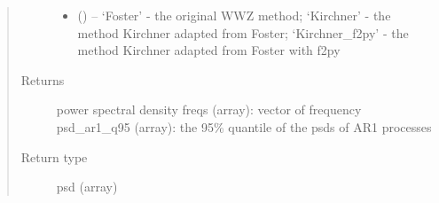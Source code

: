 \documentclass[letterpaper,10pt,english]{sphinxmanual}
\begin{document}
\begin{fulllineitems}
\begin{quote}
\begin{description}
\begin{itemize}
\item {} 
 () -- `Foster' - the original WWZ method;
`Kirchner' - the method Kirchner adapted from Foster;
`Kirchner\_f2py' - the method Kirchner adapted from Foster with f2py

\end{itemize}

\item[{Returns}] \leavevmode
power spectral density
freqs (array): vector of frequency
psd\_ar1\_q95 (array): the 95\% quantile of the psds of AR1 processes

\item[{Return type}] \leavevmode
psd (array)

\end{description}\end{quote}

\end{fulllineitems}

\end{document}
